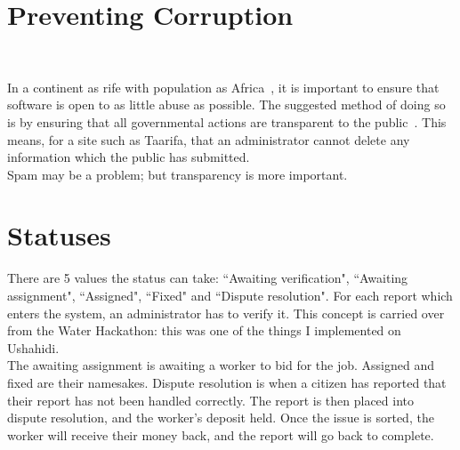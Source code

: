 \appendix

\chapter{Preventing Corruption}
~\label{app:corruption}

In a continent as rife with population as Africa~\cite{corruption}, it is important to ensure that software is open to as little abuse as possible. The suggested method of doing so is by ensuring that all governmental actions are transparent to the public~\cite{transparency}. This means, for a site such as Taarifa, that an administrator cannot delete any information which the public has submitted. \\

Spam may be a problem; but transparency is more important.

\chapter{Statuses}
\label{app:statuses}

There are 5 values the status can take: ``Awaiting verification", ``Awaiting assignment", ``Assigned", ``Fixed" and ``Dispute resolution". For each report which enters the system, an administrator has to verify it. This concept is carried over from the Water Hackathon: this was one of the things I implemented on Ushahidi. \\

The awaiting assignment is awaiting a worker to bid for the job. Assigned and fixed are their namesakes. Dispute resolution is when a citizen has reported that their report has not been handled correctly. The report is then placed into dispute resolution, and the worker's deposit held. Once the issue is sorted, the worker will receive their money back, and the report will go back to complete.